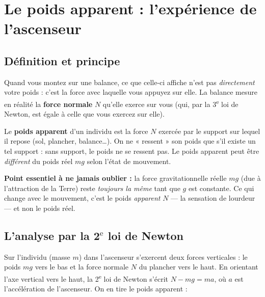 \documentclass[11pt,a4paper]{article}
\begin{document}
\section{Le poids apparent : l'expérience de l'ascenseur}

\subsection{Définition et principe}

Quand vous montez sur une balance, ce que celle-ci affiche n'est pas \emph{directement}
votre poids : c'est la force avec laquelle vous appuyez sur elle. La balance mesure en
réalité la \textbf{force normale} $N$ qu'elle exerce sur vous (qui, par la
3\textsuperscript{e} loi de Newton, est égale à celle que vous exercez sur elle).

\begin{definition}
Le \textbf{poids apparent} d'un individu est la force $N$ exercée par le support sur
lequel il repose (sol, plancher, balance\dots). On ne « ressent » son poids que s'il
existe un tel support : sans support, le poids ne se ressent pas. Le poids apparent
peut être \emph{différent} du poids réel $mg$ selon l'état de mouvement.
\end{definition}

\begin{remarque}
\textbf{Point essentiel à ne jamais oublier :} la force gravitationnelle réelle $mg$
(due à l'attraction de la Terre) reste \emph{toujours la même} tant que $g$ est constante.
Ce qui change avec le mouvement, c'est le poids \emph{apparent} $N$ — la sensation de
lourdeur — et non le poids réel.
\end{remarque}

\subsection{L'analyse par la 2\texorpdfstring{$^{\text{e}}$}{e} loi de Newton}

Sur l'individu (masse $m$) dans l'ascenseur s'exercent deux forces verticales : le poids
$mg$ vers le bas et la force normale $N$ du plancher vers le haut. En orientant l'axe
vertical vers le haut, la 2\textsuperscript{e} loi de Newton s'écrit $N-mg=ma$, où $a$
est l'accélération de l'ascenseur. On en tire le poids apparent :
\end{document}
